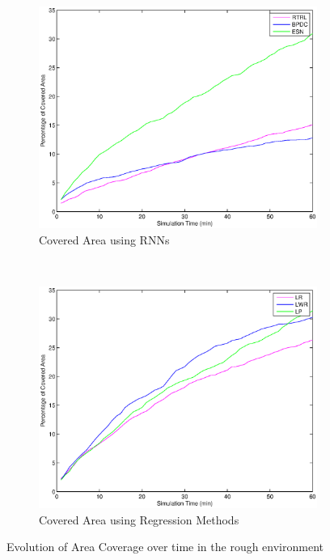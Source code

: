 \documentclass[msc,ai,logo]{infthesis}
\begin{document}
\begin{figure}[H]
        \centering
        \begin{subfigure}[b]{0.49\textwidth}
                \centering
                \includegraphics[width=\textwidth]{RNN_10_AREA.eps}
                \caption{Covered Area using RNNs}
              \label{fig:RNN_10_AREA}  
        \end{subfigure}%
        ~ %
        \begin{subfigure}[b]{0.49\textwidth}
                \centering
                \includegraphics[width=\textwidth]{LR_10_AREA.eps}
                \caption{Covered Area using Regression Methods}
               \label{fig:LR_10_AREA}  
        \end{subfigure}
        \caption{Evolution of Area Coverage over time in the rough environment}
  \label{fig:10_AREA}
\end{figure}
\end{document}
